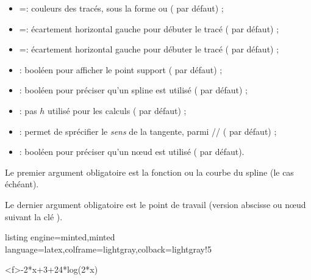 \documentclass[11pt,a4paper]{ltxdoc}
\begin{document}
\begin{itemize}
  \item {} =: couleurs des tracés, sous la forme  ou  ( par défaut) ;
  \item {} =: écartement horizontal gauche pour débuter le tracé ( par défaut) ;
  \item {} =: écartement horizontal gauche pour débuter le tracé ( par défaut) ;
  \item {} : booléen pour afficher le point support ( par défaut) ;
  \item {} : booléen pour préciser qu'un spline est utilisé ( par défaut) ;
  \item {} : pas $h$ utilisé pour les calculs ( par défaut) ;
  \item {} : permet de sprécifier le \textit{sens} de la tangente, parmi // ( par défaut) ;
  \item {} : booléen pour préciser qu'un nœud est utilisé ( par défaut).
\end{itemize}

\smallskip

Le premier argument obligatoire est la fonction ou la courbe du spline (le cas échéant).

\smallskip

Le dernier argument obligatoire est le point de travail (version abscisse ou nœud suivant la clé ).

\begin{tcblisting}{listing engine=minted,minted language=latex,colframe=lightgray,colback=lightgray!5}
\begin{GraphiqueTikz}%
  [x=0.9cm,y=0.425cm,Xmin=4,Xmax=20,Origx=4,
  Ymin=40,Ymax=56,Ygrille=2,Ygrilles=1,Origy=40]
  \DefinirCourbe[Nom=cf,Debut=5,Fin=19,Couleur=red,Trace]<f>{-2*x+3+24*log(2*x)}
\end{GraphiqueTikz}
\end{tcblisting}
\end{document}
